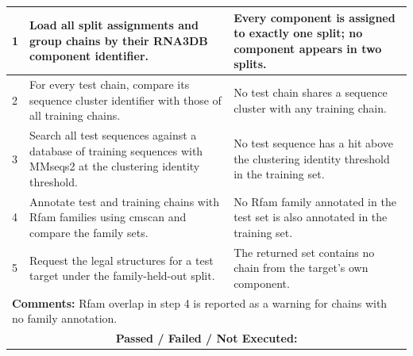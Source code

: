 \documentclass{FastFyp}
\begin{document}
{\begin{longtable}{|p{2.4cm}|p{4.6cm}|p{2.4cm}|p{3.8cm}|}
1 & Load all split assignments and group chains by their RNA3DB component identifier. & \multicolumn{2}{p{6.64cm}|}{Every component is assigned to exactly one split; no component appears in two splits.} \\ \hline
2 & For every test chain, compare its sequence cluster identifier with those of all training chains. & \multicolumn{2}{p{6.64cm}|}{No test chain shares a sequence cluster with any training chain.} \\ \hline
3 & Search all test sequences against a database of training sequences with MMseqs2 at the clustering identity threshold. & \multicolumn{2}{p{6.64cm}|}{No test sequence has a hit above the clustering identity threshold in the training set.} \\ \hline
4 & Annotate test and training chains with Rfam families using cmscan and compare the family sets. & \multicolumn{2}{p{6.64cm}|}{No Rfam family annotated in the test set is also annotated in the training set.} \\ \hline
5 & Request the legal structures for a test target under the family-held-out split. & \multicolumn{2}{p{6.64cm}|}{The returned set contains no chain from the target's own component.} \\ \hline
\multicolumn{4}{|p{14.51cm}|}{\textbf{Comments:} Rfam overlap in step 4 is reported as a warning for chains with no family annotation.} \\ \hline
\multicolumn{4}{|c|}{\textbf{Passed / Failed / Not Executed:}} \\ \hline
\end{longtable}
}
\end{document}

